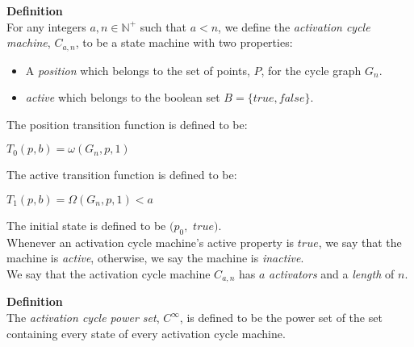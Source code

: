 \documentclass[a4paper,12pt]{article}
\begin{document}
\label{definition:cycle_machine}
\hypertarget{definition:cycle_machine}{}
\begin{tcolorbox}
\textbf{Definition}\\
For any integers $a, n \in \mathbb{N^+}$ such that $a < n$, we define the \textit{activation cycle machine}, $C_{a, n}$, to be a state machine with two properties:

\begin{itemize}
\item A \textit{position} which belongs to the set of points, $P$, for the cycle graph $G_n$.

\item \textit{active} which belongs to the boolean set $B = \{true, false\}$.
\end{itemize}

The position transition function is defined to be:
\begin{center}
$T_0(p, b) = \omega(G_n, p, 1)$
\end{center}

The active transition function is defined to be:
\begin{center}
$T_1(p, b) = \Omega(G_n, p, 1) < a$ 
\end{center}

The initial state is defined to be $(p_0,$ $true)$.\\

\noindent Whenever an activation cycle machine's active property is $true$, we say that the machine is \textit{active}, otherwise, we say the machine is \textit{inactive}.\\

\noindent We say that the activation cycle machine $C_{a, n}$ has $a$ \textit{activators} and a \textit{length} of $n$.

\end{tcolorbox}






\label{definition:cycle_machine}
\hypertarget{definition:cycle_machine}{}
\begin{tcolorbox}
\textbf{Definition}\\
The \textit{activation cycle power set}, $C^{\infty}$, is defined to be the power set of the set containing every state of every activation cycle machine.
\end{tcolorbox}
\end{document}
